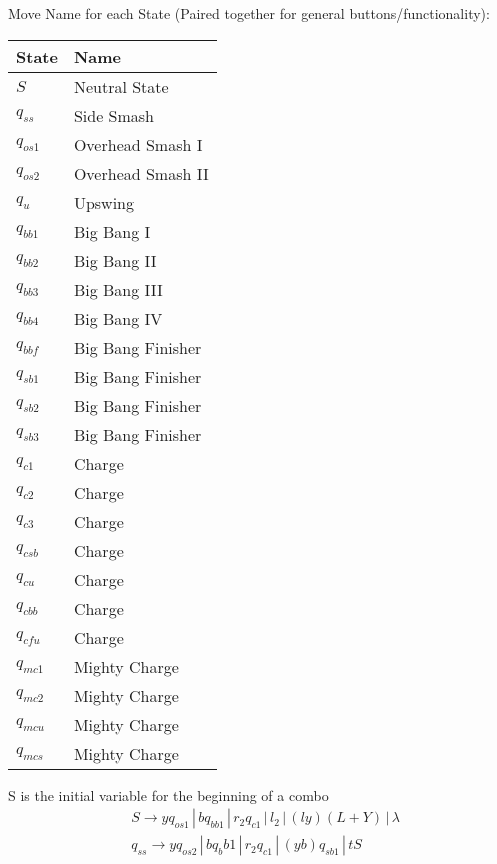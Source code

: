 \documentclass{article}
\begin{document}
\begin{mylist}
Move Name for each State (Paired together for general buttons/functionality): \\
\begin{table}[h] 
  \begin{tabular}{l | l}
    State & Name  \\
    \hline
    $S$ & Neutral State \\
    $q_{ss}$ & Side Smash \\
    $q_{os1}$ & Overhead Smash I \\
    $q_{os2}$ & Overhead Smash II \\
    $q_{u}$ & Upswing \\
    $q_{bb1}$ & Big Bang I \\
    $q_{bb2}$ & Big Bang II \\
    $q_{bb3}$ & Big Bang III \\
    $q_{bb4}$ & Big Bang IV \\
    $q_{bbf}$ & Big Bang Finisher\\
    $q_{sb1}$ & Big Bang Finisher\\
    $q_{sb2}$ & Big Bang Finisher\\
    $q_{sb3}$ & Big Bang Finisher\\
    $q_{c1}$ & Charge \\
    $q_{c2}$ & Charge \\
    $q_{c3}$ & Charge \\
    $q_{csb}$ & Charge \\
    $q_{cu}$ & Charge \\
    $q_{cbb}$ & Charge \\
    $q_{cfu}$ & Charge \\
    $q_{mc1}$ & Mighty Charge \\
    $q_{mc2}$ & Mighty Charge \\
    $q_{mcu}$ & Mighty Charge \\
    $q_{mcs}$ & Mighty Charge \\
  \end{tabular}
\end{table}
S is the initial variable for the beginning of a combo
\begin{align*}
&S \rightarrow yq_{os1} \, | \, bq_{bb1} \, | \, r_2q_{c1} \, | \, l_2 \, | \, (ly)(L+Y) \, | \, \lambda \\
&q_{ss} \rightarrow yq_{os2} \, | \, b{q_bb1} \, | \, r_2q_{c1} \, | \, (yb)q_{sb1} \, | \, tS\\

\end{align*}
\end{mylist}
\end{document}
